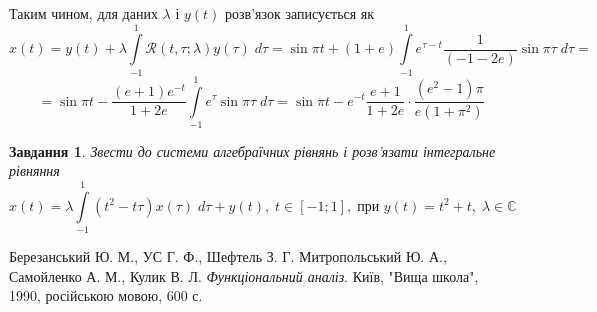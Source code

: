 \documentclass[12pt]{article} %
\newtheorem{prob}{Завдання}
\let\oldint\int
\renewcommand{\int}{\oldint\limits}
\begin{document}
	Таким чином, для даних $\lambda$ і $y(t)$ розв’язок записується як
	\[x(t)=y(t)+\lambda\int_{-1}^1\mathcal{R}(t,\tau;\lambda)y(\tau)\;d\tau=\sin\pi t+(1+e)\int_{-1}^1e^{\tau-t}\frac{1}{(-1-2e)}
	\sin\pi\tau\;d\tau=\]
	\[=\sin\pi t-\frac{(e+1)e^{-t}}{1+2e}\int_{-1}^1e^\tau\sin\pi\tau\;d\tau=\sin\pi t-e^{-t}\frac{e+1}{1+2e}\cdot
	\frac{(e^2-1)\pi}{e(1+\pi^2)}\]
\begin{prob}Звести до системи алгебраїчних рівнянь і розв’язати інтегральне рівняння
	\[x(t)=\lambda\int_{-1}^1(t^2-t\tau)x(\tau)\;d\tau+y(t),\;t\in[-1;1],\;\mbox{при }y(t)=t^2+t,\;\lambda\in\mathbb{C}\]
\end{prob}
\begin{thebibliography}{9}
Березанський Ю. М., УС Г. Ф., Шефтель З. Г.
Митропольський Ю. А., Самойленко А. М., Кулик В. Л.
\emph{Функціональний аналіз}.
Київ, "Вища школа"{}, 1990, російською мовою, 600 с.
\end{thebibliography}
\end{document}

